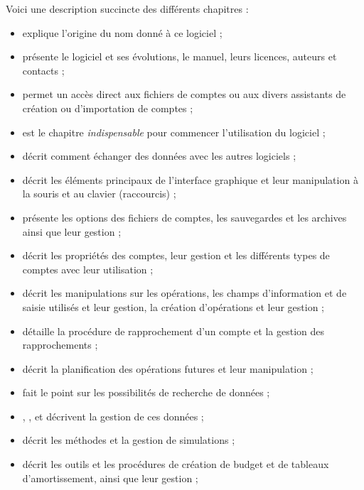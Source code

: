 Voici une description succincte des différents chapitres :

\begin{itemize}
	\item {} explique l'origine du nom donné à ce logiciel ;
	\item {} présente le logiciel et ses évolutions, le manuel, leurs licences, auteurs et contacts ;
	\item {}	permet un accès direct aux fichiers de comptes ou aux divers assistants de création  ou d'importation de comptes ;
	\item {} est le chapitre \emph{indispensable} pour commencer l'utilisation du logiciel ;
	\item {} décrit comment échanger des données avec les autres logiciels ;
	\item {} décrit les éléments principaux de l'interface graphique et leur manipulation à la souris et au clavier (raccourcis) ;
	\item {} présente les options des fichiers de comptes, les sauvegardes et les archives ainsi que leur gestion ;
	\item {} décrit les propriétés des comptes, leur gestion et les différents types de comptes avec leur utilisation ;
	\item {} décrit les manipulations sur les opérations, les champs d'information et de saisie utilisés et leur gestion, la création d'opérations et leur gestion ;
	\item {} détaille la procédure de rapprochement d'un compte et la gestion des rapprochements ;		
	\item {} décrit la planification des opérations futures et leur manipulation ;
	\item {} fait le point sur les possibilités de recherche de données ;
	\item {}, ,  et  décrivent la gestion de ces données ;
	\item {} décrit les méthodes et la gestion de simulations ;
	\item {} décrit les outils et les procédures de création de budget et de tableaux d'amortissement, ainsi que leur gestion ;

\end{itemize}
